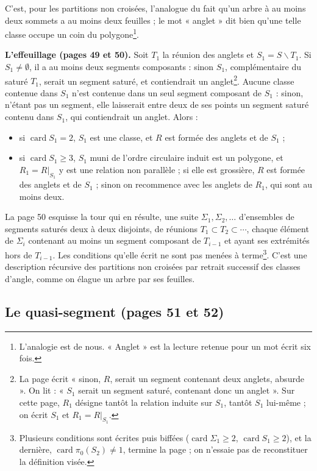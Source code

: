 \documentclass[11pt,a4paper]{article}
\begin{document}
C'est, pour les partitions non croisées, l'analogue du fait qu'un arbre à au
moins deux sommets a au moins deux feuilles ; le mot « anglet » dit bien
qu'une telle classe occupe un coin du polygone\footnote{L'analogie est de
nous. « Anglet » est la lecture retenue pour un mot écrit six fois.}.

\textbf{L'effeuillage (pages 49 et 50).} Soit $T_1$ la réunion des anglets
et $S_1 = S \smallsetminus T_1$. Si $S_1 \neq \emptyset$, il a au moins deux
segments composants : sinon $S_1$, complémentaire du saturé $T_1$, serait un
segment saturé, et contiendrait un anglet\footnote{La page écrit « sinon,
$R$, serait un segment contenant deux anglets, absurde ». On lit : « $S_1$
serait un segment saturé, contenant donc un anglet ». Sur cette page, $R_1$
désigne tantôt la relation induite sur $S_1$, tantôt $S_1$ lui-même ; on
écrit $S_1$ et $R_1 = R|_{S_1}$.}. Aucune classe contenue dans $S_1$ n'est
contenue dans un seul segment composant de $S_1$ : sinon, n'étant pas un
segment, elle laisserait entre deux de ses points un segment saturé contenu
dans $S_1$, qui contiendrait un anglet. Alors :
\begin{itemize}
  \item si $\operatorname{card} S_1 = 2$, $S_1$ est une classe, et $R$ est
  formée des anglets et de $S_1$ ;
  \item si $\operatorname{card} S_1 \geqslant 3$, $S_1$ muni de l'ordre
  circulaire induit est un polygone, et $R_1 = R|_{S_1}$ y est une relation
  non parallèle ; si elle est grossière, $R$ est formée des anglets et de
  $S_1$ ; sinon on recommence avec les anglets de $R_1$, qui sont au moins
  deux.
\end{itemize}
La page 50 esquisse la tour qui en résulte, une suite
$\Sigma_1, \Sigma_2, \ldots$ d'ensembles de segments saturés deux à deux
disjoints, de réunions $T_1 \subset T_2 \subset \cdots$, chaque élément de
$\Sigma_i$ contenant au moins un segment composant de $T_{i-1}$ et ayant ses
extrémités hors de $T_{i-1}$. Les conditions qu'elle écrit ne sont pas
menées à terme\footnote{Plusieurs conditions sont écrites puis biffées
($\operatorname{card} \Sigma_1 \geqslant 2$, $\operatorname{card} S_1
\geqslant 2$), et la dernière, $\operatorname{card} \pi_0(S_2) \neq 1$,
termine la page ; on n'essaie pas de reconstituer la définition visée.}.
C'est une description récursive des partitions non croisées par retrait
successif des classes d'angle, comme on élague un arbre par ses feuilles.

\subsection*{Le quasi-segment (pages 51 et 52)}
\end{document}
